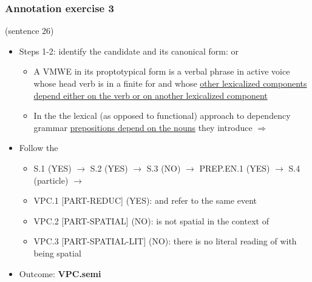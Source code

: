 \documentclass[xcolor=dvipsnames]{beamer}
\begin{document}
\begin{frame} 
\frametitle{Annotation exercise 3}

 (sentence 26)

\begin{scriptsize}
\begin{block}{}
\begin{itemize}
\item Steps 1-2: identify the candidate and its canonical form:  or 
   \begin{itemize}
   \item A VMWE in its proptotypical form is a verbal phrase in active voice whose head verb is in a finite for and whose \underline{other lexicalized components depend either on the verb or on another lexicalized component}
   \item In the the lexical (as opposed to functional) approach to dependency grammar \underline{prepositions depend on the nouns} they introduce $\Rightarrow$ 
   \end{itemize}
\item Follow the \href{http://parsemefr.lif.univ-mrs.fr/parseme-st-guidelines/1.3/?page=040\_Annotation\_process\_-\_decision\_tree}{}
   \begin{itemize}
   \item S.1 (YES) $\rightarrow$ S.2 (YES) $\rightarrow$ S.3 (NO) $\rightarrow$ PREP.EN.1 (YES) $\rightarrow$ S.4 (particle) $\rightarrow$
   \item VPC.1 [PART-REDUC] (YES):  and  refer to the same event
   \item VPC.2 [PART-SPATIAL] (NO):  is not spatial in the context of 
   \item VPC.3 [PART-SPATIAL-LIT] (NO): there is no literal reading of  with  being spatial
   \end{itemize}
\item Outcome: \textbf{VPC.semi}
\end{itemize}
\end{block}

\end{scriptsize}

\end{frame}
\end{document}
